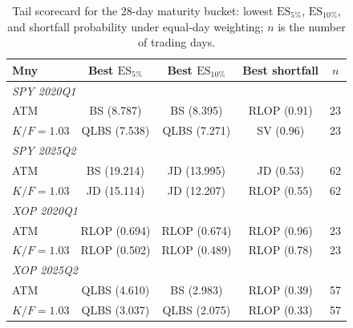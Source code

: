 \begin{table}[t]
\centering
\footnotesize
\setlength{\tabcolsep}{3.5pt}
\renewcommand{\arraystretch}{0.98}
\begin{tabular}{lcccc}
\toprule
Mny & Best $\mathrm{ES}_{5\%}$ & Best $\mathrm{ES}_{10\%}$ & Best shortfall & $n$ \\
\midrule
\multicolumn{5}{l}{\textit{SPY 2020Q1}} \\
ATM          & BS (8.787)   & BS (8.395)   & RLOP (0.91) & 23 \\
$K/F=1.03$   & QLBS (7.538) & QLBS (7.271) & SV (0.96)   & 23 \\
\midrule
\multicolumn{5}{l}{\textit{SPY 2025Q2}} \\
ATM          & BS (19.214)  & JD (13.995)  & JD (0.53)   & 62 \\
$K/F=1.03$   & JD (15.114)  & JD (12.207)  & RLOP (0.55) & 62 \\
\midrule
\multicolumn{5}{l}{\textit{XOP 2020Q1}} \\
ATM          & RLOP (0.694) & RLOP (0.674) & RLOP (0.96) & 23 \\
$K/F=1.03$   & RLOP (0.502) & RLOP (0.489) & RLOP (0.78) & 23 \\
\midrule
\multicolumn{5}{l}{\textit{XOP 2025Q2}} \\
ATM          & QLBS (4.610) & BS (2.983)   & RLOP (0.39) & 57 \\
$K/F=1.03$   & QLBS (3.037) & QLBS (2.075) & RLOP (0.33) & 57 \\
\bottomrule
\end{tabular}
\caption{Tail scorecard for the 28-day maturity bucket: lowest $\mathrm{ES}_{5\%}$, $\mathrm{ES}_{10\%}$, and shortfall probability under equal-day weighting; $n$ is the number of trading days.}
\label{tab:scorecard_28d}
\end{table}

